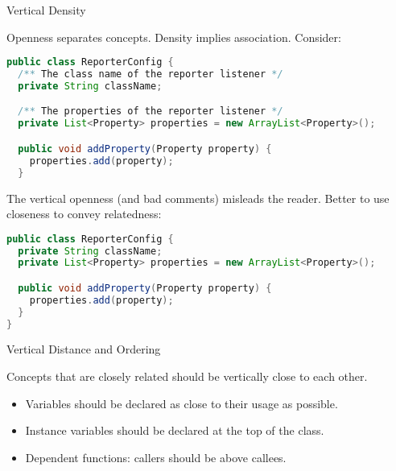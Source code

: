 \documentclass{beamer}
\begin{document}
\begin{frame}[fragile]{Vertical Density}

\vspace{-.05in}
Openness separates concepts. Density implies association. Consider:
\vspace{-.25in}
\begin{lstlisting}[language=Java]
public class ReporterConfig {
  /** The class name of the reporter listener */
  private String className;

  /** The properties of the reporter listener */
  private List<Property> properties = new ArrayList<Property>();

  public void addProperty(Property property) {
    properties.add(property);
  }
\end{lstlisting}
\vspace{-.05in}
The vertical openness (and bad comments) misleads the reader.  Better to use closeness to convey relatedness:
\vspace{-.05in}
\begin{lstlisting}[language=Java]
public class ReporterConfig {
  private String className;
  private List<Property> properties = new ArrayList<Property>();

  public void addProperty(Property property) {
    properties.add(property);
  }
}
\end{lstlisting}

\end{frame}

\begin{frame}[fragile]{Vertical Distance and Ordering}


Concepts that are closely related should be vertically close to each other.
\begin{itemize}
\item Variables should be declared as close to their usage as possible.
\item Instance variables should be declared at the top of the class.
\item Dependent functions: callers should be above callees.
\end{itemize}


\end{frame}
\end{document}
